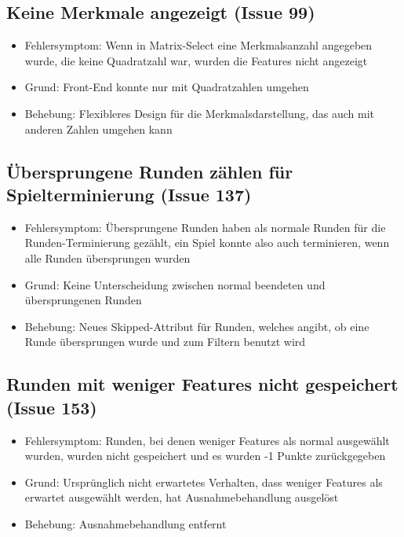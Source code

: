 \documentclass[a4paper]{scrreprt}
\begin{document}
    \subsection{Keine Merkmale angezeigt (Issue 99)}
    \begin{itemize}
    \item Fehlersymptom: Wenn in Matrix-Select eine Merkmalsanzahl angegeben wurde,
    die keine Quadratzahl war, wurden die Features nicht angezeigt
    \item Grund: Front-End konnte nur mit Quadratzahlen umgehen
    \item Behebung: Flexibleres Design für die Merkmalsdarstellung, das auch mit anderen
     Zahlen umgehen kann
    \end{itemize}

    \subsection{Übersprungene Runden zählen für Spielterminierung (Issue 137)}
    \begin{itemize}
    \item Fehlersymptom: Übersprungene Runden haben als normale Runden für die
     Runden-Terminierung gezählt, ein Spiel konnte also auch terminieren, wenn alle
      Runden übersprungen wurden
    \item Grund: Keine Unterscheidung zwischen normal beendeten und übersprungenen
     Runden 
    \item Behebung: Neues Skipped-Attribut für Runden, welches angibt, ob eine
     Runde übersprungen wurde und zum Filtern benutzt wird
    \end{itemize}

    \subsection{Runden mit weniger Features nicht gespeichert (Issue 153)}
    \begin{itemize}
    \item Fehlersymptom: Runden, bei denen weniger Features als normal ausgewählt
     wurden, wurden nicht gespeichert und es wurden -1 Punkte zurückgegeben
    \item Grund: Ursprünglich nicht erwartetes Verhalten, dass weniger Features
     als erwartet ausgewählt werden, hat Ausnahmebehandlung ausgelöst
    \item Behebung: Ausnahmebehandlung entfernt
    \end{itemize}
\end{document}
